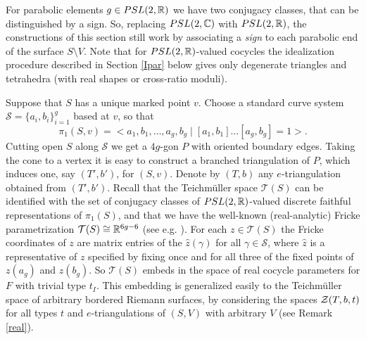 \begin{remark}\label{real} {\rm For parabolic elements $g \in
    PSL(2,{\mathbb R})$ we have two conjugacy classes, that can be
distinguished by a sign. So, replacing $PSL(2,{\mathbb C})$ with
$PSL(2,{\mathbb R})$, the constructions of this section still work by
associating a {\it sign} to each parabolic end of the surface $S
\setminus V$. Note that for $PSL(2,{\mathbb R})$-valued cocycles the
idealization procedure described in Section \ref{Ipar} below gives
only degenerate triangles and tetrahedra (with real shapes or
cross-ratio moduli).}
\end{remark}

 Suppose that $S$ has a
unique marked point $v$. Choose a standard curve system
$\mathcal{S}=\{a_i,b_i\}_{i=1}^{g}$ based at $v$, so that
$$\pi_1(S,v) =<a_1,b_1,\ldots,a_g,b_g\mid [a_1,b_1]\ldots
[a_g,b_g] =1>.$$ Cutting open $S$ along $\mathcal{S}$ we get a
$4g$-gon $P$ with oriented boundary edges. Taking the cone to a
vertex it is easy to construct a branched triangulation of $P$,
which induces one, say $(T',b')$, for $(S,v)$.  Denote by $(T,b)$
any $e$-triangulation obtained from $(T',b')$. \hfill\break Recall
that the Teichm\"uller space $\mathcal{T}(S)$ can be identified
with the set of conjugacy classes of $PSL(2,\mathbb{R})$-valued discrete
faithful representations of $\pi_1(S)$, and that we have the
well-known (real-analytic) Fricke parametrization $\mathcal{T}(S)
\cong \mathbb{R}^{6g-6}$ (see e.g. \cite{Ab}). For each $z \in
\mathcal{T}(S)$ the Fricke coordinates of $z$ are matrix entries
of the $\hat{z}(\gamma)$ for all $\gamma \in \mathcal{S}$, where
$\hat{z}$ is a representative of $z$ specified by fixing once and
for all three of the fixed points of $z(a_g)$ and $z(b_g)$. So
$\mathcal{T}(S)$ embeds in the space of real cocycle parameters
for $F$ with trivial type $t_I$. This embedding is generalized
easily to the Teichm\"uller space of arbitrary bordered Riemann
surfaces, by considering the spaces ${\mathcal Z}(T,b,t)$ for all types $t$
and $e$-triangulations of $(S,V)$ with arbitrary $V$ (see Remark
\ref{real}).

